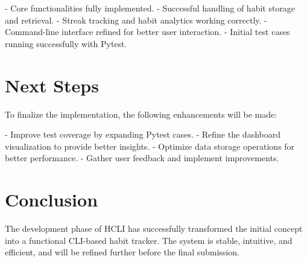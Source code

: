\documentclass[a4paper,12pt]{article}
\begin{document}
- Core functionalities fully implemented.
- Successful handling of habit storage and retrieval.
- Streak tracking and habit analytics working correctly.
- Command-line interface refined for better user interaction.
- Initial test cases running successfully with Pytest.

\section{Next Steps}
To finalize the implementation, the following enhancements will be made:

- Improve test coverage by expanding Pytest cases.
- Refine the dashboard visualization to provide better insights.
- Optimize data storage operations for better performance.
- Gather user feedback and implement improvements.

\section{Conclusion}
The development phase of HCLI has successfully transformed the initial concept into a functional CLI-based habit tracker. The system is stable, intuitive, and efficient, and will be refined further before the final submission.
\end{document}
